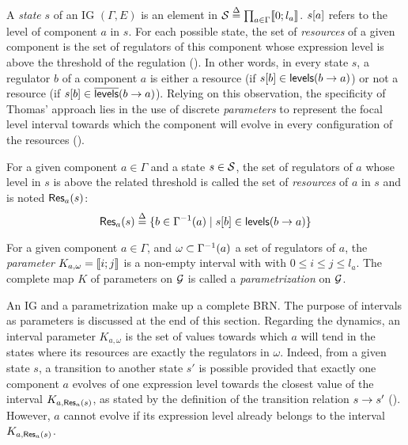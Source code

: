 A \emph{state} $s$ of an IG $(\Gamma, E)$ is an element in $\mathcal{S} \stackrel{\Delta}= \prod_{a \in \Gamma} \llbracket 0 ; l_a \rrbracket$.
${s[a]}$ refers to the level of component $a$ in $s$.
For each possible state, the set of \emph{resources} of a given component
is the set of regulators of this component whose expression level is above the threshold of the regulation ().
In other words, in every state $s$, a regulator $b$ of a component $a$
is either a resource (if ${s[b]} \in \mathsf{levels}(b\rightarrow a)$)
or not a resource (if ${s[b]} \in \overline{\mathsf{levels}}(b\rightarrow a)$).
Relying on this observation, the specificity of Thomas' approach lies in the use of discrete \emph{parameters} to represent the
focal level interval towards which the component will evolve in every configuration of the resources ().

\begin{definition}\label{def:resources}
For a given component $a \in \Gamma$ and a state $s \in \mathcal{S}$,
the set of regulators of $a$ whose level in $s$ is above the related threshold %
is called the set of \emph{resources} of $a$ in $s$ and is noted $\mathsf{Res}_{a}(s)$:
$$\mathsf{Res}_{a}(s) \stackrel{\Delta}= \{ b \in \Gamma^{-1}(a) \mid {s[b]} \in \mathsf{levels}(b\rightarrow a) \}$$
\end{definition}

\begin{definition}\label{def:param}
For a given component $a \in \Gamma$, and $\omega \subset \Gamma^{-1}(a)$ a set of regulators of $a$,
the \emph{parameter} $K_{a,\omega} = \llbracket i ; j \rrbracket$ is a non-empty interval with with $0 \leq i \leq j \leq l_a$.
The complete map $K$ of parameters on $\mathcal{G}$ is called a \emph{parametrization} on $\mathcal{G}$.
\end{definition}

An IG and a parametrization make up a complete BRN.
The purpose of intervals as parameters is discussed at the end of this section.
Regarding the dynamics, an interval parameter $K_{a,\omega}$ is the set of values towards which $a$ will tend
in the states where its resources are exactly the regulators in $\omega$.
Indeed, from a given state $s$, a transition to another state $s'$ is possible provided that
exactly one component $a$ evolves of one expression level towards the closest value of the interval $K_{a,\mathsf{Res}_{a}(s)}$,
as stated by the definition of the transition relation $s \rightarrow s'$ ().
However, $a$ cannot evolve if its expression level already belongs to the interval $K_{a,\mathsf{Res}_{a}(s)}$.

